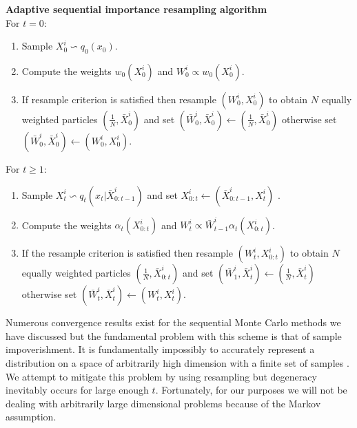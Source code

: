 \textbf{Adaptive sequential importance resampling algorithm}\\
For $t=0$:
\begin{enumerate}
\item
Sample $X^i_0 \backsim q_0(x_0)$.
\item
Compute the weights $w_0(X_0^i)$ and $W^i_0 \propto w_0(X^i_0)$.
\item
If resample criterion is satisfied then resample $(W^i_0, X^i_0)$ to obtain $N$ equally weighted particles $(\frac{1}{N}, \bar{X}^i_0)$ and set $(\bar{W}^i_0, \bar{X}^i_0) \leftarrow (\frac{1}{N}, \bar{X}^i_0)$ otherwise set $(\bar{W}^i_0, \bar{X}^i_0) \leftarrow ({W}^i_0, {X}^i_0)$.
\end{enumerate}
For $t \geq 1$:
\begin{enumerate}
\item
Sample $X^i_t \backsim q_t(x_t|\bar{X}^i_{0:t-1})$ and set ${X}^i_{0:t} \leftarrow (\bar{X}^i_{0:t-1}, X^i_t)$ .
\item
Compute the weights $\alpha_t(X^i_{0:t})$ and $W^i_t \propto \bar{W}^i_{t-1}\alpha_t(X^i_{0:t})$.
\item
If the resample criterion is satisfied then resample $(W^i_t, X^i_{0:t})$ to obtain $N$ equally weighted particles $(\frac{1}{N}, \bar{X}^i_{0:t})$ and set $(\bar{W}^i_1, \bar{X}^i_t) \leftarrow (\frac{1}{N}, \bar{X}^i_t)$ otherwise set $(\bar{W}^i_t, \bar{X}^i_t) \leftarrow ({W}^i_t, {X}^i_t)$.
\end{enumerate}

Numerous convergence results exist for the sequential Monte Carlo methods we have discussed but the fundamental problem with this scheme is that of sample impoverishment. It is fundamentally impossibly to accurately represent a distribution on a space of arbitrarily high dimension with a finite set of samples \cite{pftut}. We attempt to mitigate this problem by using resampling but degeneracy inevitably occurs for large enough $t$. Fortunately, for our purposes we will not be dealing with arbitrarily large dimensional problems because of the Markov assumption.


